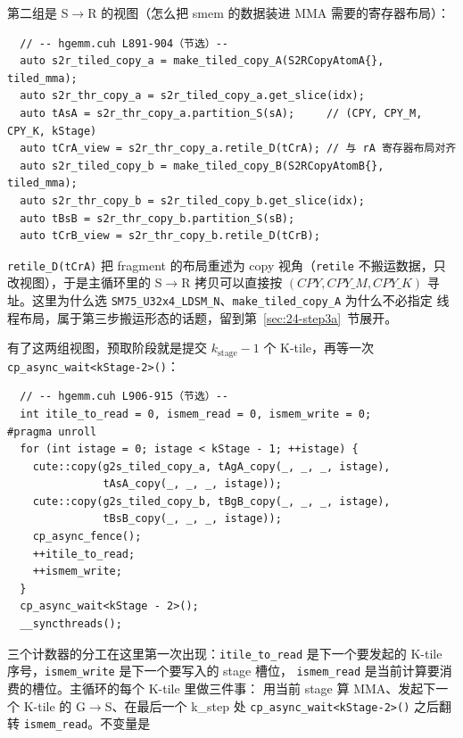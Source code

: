 第二组是 S$\to$R 的视图（怎么把 smem 的数据装进 MMA 需要的寄存器布局）：

\begin{lstlisting}
  // -- hgemm.cuh L891-904（节选）--
  auto s2r_tiled_copy_a = make_tiled_copy_A(S2RCopyAtomA{}, tiled_mma);
  auto s2r_thr_copy_a = s2r_tiled_copy_a.get_slice(idx);
  auto tAsA = s2r_thr_copy_a.partition_S(sA);     // (CPY, CPY_M, CPY_K, kStage)
  auto tCrA_view = s2r_thr_copy_a.retile_D(tCrA); // 与 rA 寄存器布局对齐
  auto s2r_tiled_copy_b = make_tiled_copy_B(S2RCopyAtomB{}, tiled_mma);
  auto s2r_thr_copy_b = s2r_tiled_copy_b.get_slice(idx);
  auto tBsB = s2r_thr_copy_b.partition_S(sB);
  auto tCrB_view = s2r_thr_copy_b.retile_D(tCrB);
\end{lstlisting}

\texttt{retile\_\allowbreak{}D\allowbreak{}(t\allowbreak{}Cr\allowbreak{}A)} 把 fragment 的布局重述为 copy 视角（\texttt{retile}
不搬运数据，只改视图），于是主循环里的 S$\to$R 拷贝可以直接按
$(CPY, CPY\_M, CPY\_K)$ 寻址。这里为什么选
\texttt{SM75\_\allowbreak{}U32x4\_\allowbreak{}LDSM\_\allowbreak{}N}、\texttt{make\_\allowbreak{}tiled\_\allowbreak{}copy\_\allowbreak{}A} 为什么不必指定
线程布局，属于第三步搬运形态的话题，留到第~\ref{sec:24-step3a}~节展开。

有了这两组视图，预取阶段就是提交 $k_{\mathrm{stage}}-1$ 个 K-tile，再等一次
\texttt{cp\_\allowbreak{}async\_\allowbreak{}wait\allowbreak{}<k\allowbreak{}Stage-2>\allowbreak{}()}：

\begin{lstlisting}
  // -- hgemm.cuh L906-915（节选）--
  int itile_to_read = 0, ismem_read = 0, ismem_write = 0;
#pragma unroll
  for (int istage = 0; istage < kStage - 1; ++istage) {
    cute::copy(g2s_tiled_copy_a, tAgA_copy(_, _, _, istage),
               tAsA_copy(_, _, _, istage));
    cute::copy(g2s_tiled_copy_b, tBgB_copy(_, _, _, istage),
               tBsB_copy(_, _, _, istage));
    cp_async_fence();
    ++itile_to_read;
    ++ismem_write;
  }
  cp_async_wait<kStage - 2>();
  __syncthreads();
\end{lstlisting}

三个计数器的分工在这里第一次出现：\texttt{itile\_\allowbreak{}to\_\allowbreak{}read} 是下一个要发起的
K-tile 序号，\texttt{ismem\_write} 是下一个要写入的 stage 槽位，
\texttt{ismem\_read} 是当前计算要消费的槽位。主循环的每个 K-tile 里做三件事：
用当前 stage 算 MMA、发起下一个 K-tile 的 G$\to$S、在最后一个 k\_step 处
\texttt{cp\_\allowbreak{}async\_\allowbreak{}wait\allowbreak{}<k\allowbreak{}Stage-2>\allowbreak{}()} 之后翻转 \texttt{ismem\_read}。不变量是


